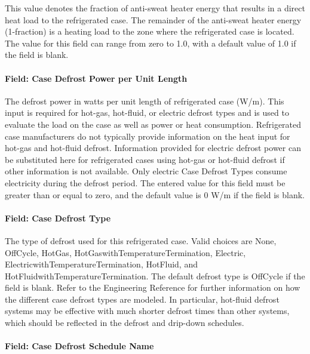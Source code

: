 This value denotes the fraction of anti-sweat heater energy that results in a direct heat load to the refrigerated case. The remainder of the anti-sweat heater energy (1-fraction) is a heating load to the zone where the refrigerated case is located. The value for this field can range from zero to 1.0, with a default value of 1.0 if the field is blank.

\paragraph{Field: Case Defrost Power per Unit Length}\label{field-case-defrost-power-per-unit-length}

The defrost power in watts per unit length of refrigerated case (W/m). This input is required for hot-gas, hot-fluid, or electric defrost types and is used to evaluate the load on the case as well as power or heat consumption. Refrigerated case manufacturers do not typically provide information on the heat input for hot-gas and hot-fluid defrost. Information provided for electric defrost power can be substituted here for refrigerated cases using hot-gas or hot-fluid defrost if other information is not available. Only electric Case Defrost Types consume electricity during the defrost period. The entered value for this field must be greater than or equal to zero, and the default value is 0 W/m if the field is blank.

\paragraph{Field: Case Defrost Type}\label{field-case-defrost-type}

The type of defrost used for this refrigerated case. Valid choices are None, OffCycle, HotGas, HotGaswithTemperatureTermination, Electric, ElectricwithTemperatureTermination, HotFluid, and HotFluidwithTemperatureTermination. The default defrost type is OffCycle if the field is blank. Refer to the Engineering Reference for further information on how the different case defrost types are modeled. In particular, hot-fluid defrost systems may be effective with much shorter defrost times than other systems, which should be reflected in the defrost and drip-down schedules.

\paragraph{Field: Case Defrost Schedule Name}\label{field-case-defrost-schedule-name}

